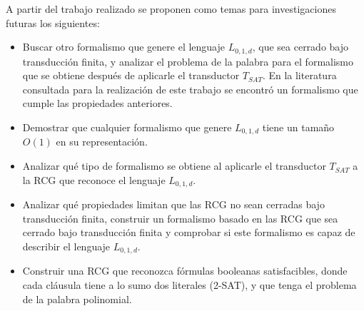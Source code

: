 \begin{conclusionsAndRecomendations}
    A partir del trabajo realizado se proponen como temas para investigaciones futuras los
    siguientes:
    
    \begin{itemize}
        \item Buscar otro formalismo que genere el lenguaje $L_{0,1,d}$, que sea cerrado bajo transducción finita, y analizar el problema de la palabra para el formalismo que se obtiene después de aplicarle el transductor $T_{SAT}$. En la literatura
              consultada \cite{globalIndexLanguages} para la realización de este trabajo se encontró un formalismo que cumple las propiedades anteriores.
        \item Demostrar que cualquier formalismo que genere $L_{0,1,d}$ tiene un tamaño $O(1)$ en su representación.
        \item Analizar qué tipo de formalismo se obtiene al aplicarle el transductor $T_{SAT}$ a la RCG que reconoce el lenguaje $L_{0,1,d}$.
        \item Analizar qué propiedades limitan que las RCG no sean cerradas bajo transducción finita, construir un formalismo basado en las RCG que sea cerrado bajo transducción finita y comprobar si este formalismo es capaz de describir el lenguaje $L_{0,1,d}$.
        \item Construir una RCG que reconozca fórmulas booleanas satisfacibles, donde cada cláusula tiene a lo sumo dos literales (2-SAT), y que tenga el problema de la palabra polinomial.
    \end{itemize}
    
\end{conclusionsAndRecomendations}
